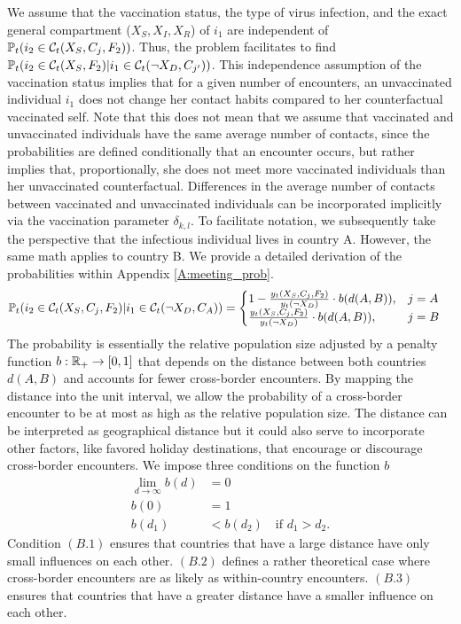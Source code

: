 We assume that the vaccination status, the type of virus infection, and the exact general compartment ($X_S, X_I, X_R$) of $i_1$ are independent of $\mathbb{P}_t(i_2 \in \mathcal{C}_t(X_S, C_j, F_2)) $. Thus, the problem facilitates to find $\mathbb{P}_t(i_2 \in \mathcal{C}_t(X_S, F_2) | i_1 \in \mathcal{C}_t(\neg X_D, C_{j'}))$. 
This independence assumption of the vaccination status implies that for a given number of encounters, an unvaccinated individual $i_1$ does not change her contact habits compared to her counterfactual vaccinated self. Note that this does not mean that we assume that vaccinated and unvaccinated individuals have the same average number of contacts, since the probabilities are defined conditionally that an encounter occurs, but rather implies that, proportionally, she does not meet more vaccinated individuals than her unvaccinated counterfactual. Differences in the average number of contacts between vaccinated and unvaccinated individuals can be incorporated implicitly via the vaccination parameter $\delta_{k,l}$. To facilitate notation, we subsequently take the perspective that the infectious individual lives in country A. However, the same math applies to country B. We provide a detailed derivation of the probabilities within Appendix \ref{A:meeting_prob}.
\begin{align}
\label{eq:cond_meeting_prob}
\mathbb{P}_t(i_2 \in \mathcal{C}_t(X_S, C_j, F_2)|i_1 \in \mathcal{C}_t(\neg X_D, C_A)) &= \begin{cases} 
      1-\frac{y_t(X_S, C_j, F_2)}{y_t(\neg X_D)} \cdot b(d(A, B)), & j = A \\
      \frac{y_t(X_S, C_j, F_2)}{y_t(\neg X_D)} \cdot b(d(A, B)), & j = B 
   \end{cases}
\end{align}
The probability is essentially the relative population size adjusted by a penalty function $b: \mathbb{R}_+ \to [0,1]$ that depends on the distance between both countries $d(A, B)$ and accounts for fewer cross-border encounters. By mapping the distance into the unit interval, we allow the probability of a cross-border encounter to be at most as high as the relative population size. The distance can be interpreted as geographical distance but it could also serve to incorporate other factors, like favored holiday destinations, that encourage or discourage cross-border encounters. We impose three conditions on the function $b$
\begin{align}
\lim_{d \to \infty} b(d) &= 0 \tag{B.1}\\
b(0) &= 1 \tag{B.2}\\
b(d_1) &< b(d_2) \quad \textrm{if } d_1 > d_2. \tag{B.3}
\end{align}
Condition $(B.1)$ ensures that countries that have a large distance have only small influences on each other. $(B.2)$ defines a rather theoretical case where cross-border encounters are as likely as within-country encounters. $(B.3)$ ensures that countries that have a greater distance have a smaller influence on each other. \\

